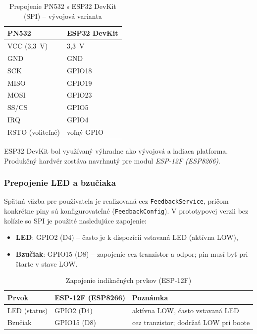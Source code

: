 \begin{table}[h!]
  \centering
  \caption{Prepojenie PN532 s ESP32 DevKit (SPI) -- vývojová varianta}
  \label{tab:pn532-esp32-wiring}
  \begin{tabular}{ll}
    \toprule
    PN532 & ESP32 DevKit \\
    \midrule
    VCC (3,3~V) & 3,3~V \\
    GND & GND \\
    SCK & GPIO18 \\
    MISO & GPIO19 \\
    MOSI & GPIO23 \\
    SS/CS & GPIO5 \\
    IRQ & GPIO4 \\
    RSTO (voliteľné) & voľný GPIO \\
    \bottomrule
  \end{tabular}
\end{table}

ESP32 DevKit bol využívaný výhradne ako vývojová a ladiaca platforma. Produkčný hardvér zostáva navrhnutý pre modul \textit{ESP-12F (ESP8266)}.

\subsubsection{Prepojenie LED a bzučiaka}
Spätná väzba pre používateľa je realizovaná cez \texttt{FeedbackService}, pričom konkrétne piny sú konfigurovateľné (\texttt{FeedbackConfig}). V prototypovej verzii bez kolízie so SPI je použité nasledujúce zapojenie:
\begin{itemize}
  \item \textbf{LED}: GPIO2 (D4) -- často je k dispozícii vstavaná LED (aktívna LOW),
  \item \textbf{Bzučiak}: GPIO15 (D8) -- zapojenie cez tranzistor a odpor; pin musí byť pri štarte v stave LOW.
\end{itemize}

\begin{table}[h!]
  \centering
  \caption{Zapojenie indikačných prvkov (ESP-12F)}
  \label{tab:feedback-wiring}
  \begin{tabular}{lll}
    \toprule
    Prvok & ESP-12F (ESP8266) & Poznámka \\
    \midrule
    LED (status) & GPIO2 (D4) & aktívna LOW, často vstavaná LED \\
    Bzučiak & GPIO15 (D8) & cez tranzistor; dodržať LOW pri boote \\
    \bottomrule
  \end{tabular}
\end{table}

